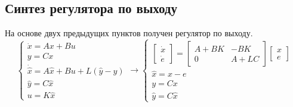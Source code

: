 \subsection{Синтез регулятора по выходу}
На основе двух предыдущих пунктов получен регулятор по выходу.
\[
        \begin{cases}
                \dot{x} = A x + B u\\
                y = C x \\
                \dot{\hat{x}} = A \hat{x} + B u + L(\hat{y} - y) \\
                \hat{y} = C \hat{x} \\
                u = K \hat{x}
        \end{cases} \rightarrow
        \begin{cases}
            \begin{bmatrix} 
                \dot{x} \\
                \dot{e}
            \end{bmatrix} = 
            \begin{bmatrix} 
                A + BK & -BK\\
                0 & A + LC
            \end{bmatrix}
            \begin{bmatrix} 
              x \\
              e
          \end{bmatrix} 
            \\
            \hat{x} = x - e \\
            y = Cx \\
            \hat{y} = C \hat{x}
         \end{cases}
         
\]

\FloatBarrier